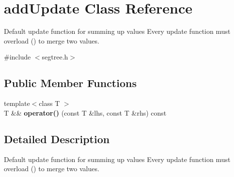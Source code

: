 \hypertarget{classadd_update}{}\section{add\+Update Class Reference}
\label{classadd_update}


Default update function for summing up values Every update function must overload () to merge two values.  




{\ttfamily \#include $<$segtree.\+h$>$}

\subsection*{Public Member Functions}
\begin{DoxyCompactItemize}
\item 
\mbox{\label{classadd_update_a695e40d5733718944ffa094b04ff2278}} 
{\footnotesize template$<$class T $>$ }\\T \&\& {\bfseries operator()} (const T \&lhs, const T \&rhs) const
\end{DoxyCompactItemize}


\subsection{Detailed Description}
Default update function for summing up values Every update function must overload () to merge two values. 